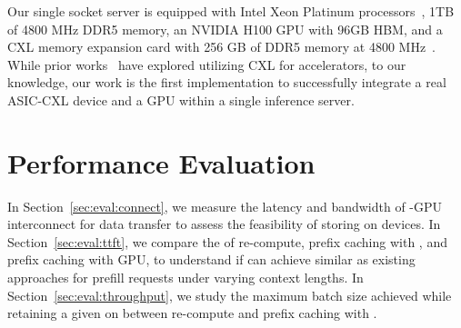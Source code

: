 Our single socket server is equipped with Intel Xeon Platinum processors~\cite{intelplatinum}, 1TB of 4800 MHz DDR5 memory, an NVIDIA H100 GPU with 96GB HBM, and a CXL memory expansion card with 256 GB of DDR5 memory at 4800 MHz~\cite{cxl2}. 
While prior works~\cite{cxlgpu1, cxlgpu2, cxlgpu3} have explored utilizing CXL for accelerators, to our knowledge, our work is the first implementation to successfully integrate a real ASIC-CXL device and a GPU within a single inference server.

\section{Performance Evaluation}
\label{sec:eval}

In Section~\ref{sec:eval:connect}, we measure the latency and bandwidth of \cxl-GPU interconnect for data transfer to assess the feasibility of storing \kvcache on \cxl devices.
In Section~\ref{sec:eval:ttft}, we compare the \ttft of \kv re-compute, prefix caching with \cxl, and prefix caching with GPU, to understand if \tool can achieve similar \ttft as existing approaches for prefill requests under varying context lengths.
In Section~\ref{sec:eval:throughput}, we study the maximum batch size achieved while retaining a given \slo on \ttft between \kv re-compute and prefix caching with \cxl.


